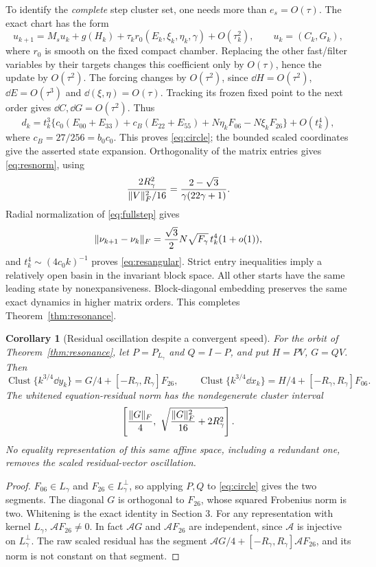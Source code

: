 \documentclass[11pt]{article}
\newtheorem{corollary}[theorem]{Corollary}
\theoremstyle{remark}\newtheorem{remark}[theorem]{Remark}
\newcommand{\Clust}{\operatorname{Clust}}\newcommand{\diag}{\operatorname{diag}}
\numberwithin{equation}{section}
\begin{document}
To identify the \emph{complete} step cluster set, one needs more than $e_s=O(\tau)$. The exact chart has the form
\[
 u_{k+1}=M_su_k+g(H_k)+\tau_k r_0(E_k,\xi_k,\eta_k,\gamma)+O(\tau_k^2),
 \qquad u_k=(C_k,G_k),
\]
where $r_0$ is smooth on the fixed compact chamber. Replacing the other fast/filter variables by their targets changes this coefficient only by $O(\tau)$, hence the update by $O(\tau^2)$. The forcing changes by $O(\tau^2)$, since $\dd H=O(\tau^2)$, $\dd E=O(\tau^3)$ and $\dd(\xi,\eta)=O(\tau)$. Tracking its frozen fixed point to the next order gives $\dd C,\dd G=O(\tau^2)$. Thus
\begin{equation}\label{eq:fullstep}
 d_k=t_k^3\{c_0(E_{00}+E_{33})+c_B(E_{22}+E_{55})
 +N\eta_kF_{06}-N\xi_kF_{26}\}+O(t_k^4),
\end{equation}
where $c_B=27/256=b_0c_0$. This proves \eqref{eq:circle}; the bounded scaled coordinates give the asserted state expansion. Orthogonality of the matrix entries gives \eqref{eq:resnorm}, using
\[
 \frac{2R_\gamma^2}{\lVert V\rVert_F^2/16}
 =\frac{2-\sqrt3}{\gamma(22\gamma+1)}.
\]
Radial normalization of \eqref{eq:fullstep} gives
\[
 \lVert \nu_{k+1}-\nu_k\rVert_F
 =\frac{\sqrt3}{2}N\sqrt{F_\gamma}\,t_k^4(1+o(1)),
\]
and $t_k^4\sim(4c_0k)^{-1}$ proves \eqref{eq:resangular}. Strict entry inequalities imply a relatively open basin in the invariant block space. All other starts have the same leading state by nonexpansiveness. Block-diagonal embedding preserves the same exact dynamics in higher matrix orders. This completes Theorem~\ref{thm:resonance}.

\begin{corollary}[Residual oscillation despite a convergent speed]
For the orbit of Theorem~\ref{thm:resonance}, let $P=P_{L_\gamma}$ and $Q=I-P$, and put $H=PV$, $G=QV$. Then
\[
 \Clust\{k^{3/4}\dd y_k\}=G/4+[-R_\gamma,R_\gamma]F_{26},\qquad
 \Clust\{k^{3/4}\dd x_k\}=H/4+[-R_\gamma,R_\gamma]F_{06}.
\]
The whitened equation-residual norm has the nondegenerate cluster interval
\[
 \left[\frac{\lVert G\rVert_F}{4},\
 \sqrt{\frac{\lVert G\rVert_F^2}{16}+2R_\gamma^2}\right].
\]
No equality representation of this same affine space, including a redundant one, removes the scaled residual-vector oscillation.
\end{corollary}
\begin{proof}
$F_{06}\in L_\gamma$ and $F_{26}\in L_\gamma^\perp$, so applying $P,Q$ to \eqref{eq:circle} gives the two segments. The diagonal $G$ is orthogonal to $F_{26}$, whose squared Frobenius norm is two. Whitening is the exact identity in Section 3. For any representation with kernel $L_\gamma$, $\mathcal A F_{26}\ne0$. In fact $\mathcal A G$ and $\mathcal A F_{26}$ are independent, since $\mathcal A$ is injective on $L_\gamma^\perp$. The raw scaled residual has the segment $\mathcal A G/4+[-R_\gamma,R_\gamma]\mathcal A F_{26}$, and its norm is not constant on that segment.
\end{proof}
\end{document}
